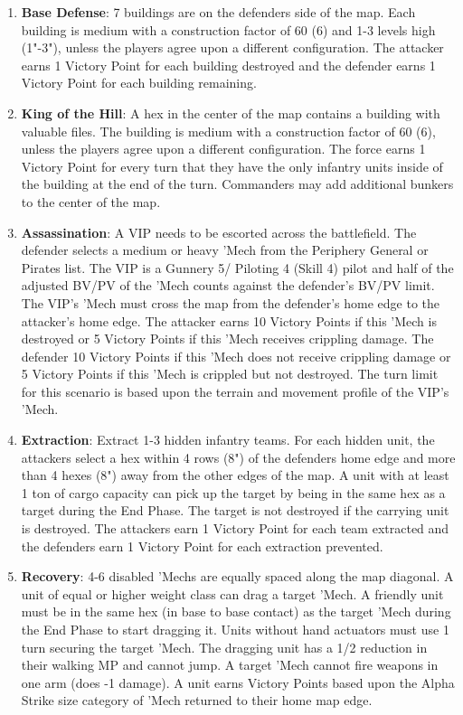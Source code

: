 \begin{enumerate}
  \item {\bfseries Base Defense}: 7 buildings are on the defenders side of the map.
    Each building is medium with a construction factor of 60 (6) and 1-3 levels high (1"-3"), unless the players agree upon a different configuration.
    The attacker earns 1 Victory Point for each building destroyed and the defender earns 1 Victory Point for each building remaining.

  \item {\bfseries King of the Hill}: A hex in the center of the map contains a building with valuable files.
    The building is medium with a construction factor of 60 (6), unless the players agree upon a different configuration.
    The force earns 1 Victory Point for every turn that they have the only infantry units inside of the building at the end of the turn.
    Commanders may add additional bunkers to the center of the map.

\item {\bfseries Assassination}: A VIP needs to be escorted across the battlefield.
    The defender selects a medium or heavy 'Mech from the Periphery General or Pirates list.
    The VIP is a Gunnery 5/ Piloting 4 (Skill 4) pilot and half of the adjusted BV/PV of the 'Mech counts against the defender's BV/PV limit.
    The VIP's 'Mech must cross the map from the defender's home edge to the attacker's home edge.
    The attacker earns 10 Victory Points if this 'Mech is destroyed or 5 Victory Points if this 'Mech receives crippling damage.
    The defender 10 Victory Points if this 'Mech does not receive crippling damage or 5 Victory Points if this 'Mech is crippled but not destroyed.
    The turn limit for this scenario is based upon the terrain and movement profile of the VIP's 'Mech.

  \item {\bfseries Extraction}: Extract 1-3 hidden infantry teams.
    For each hidden unit, the attackers select a hex within 4 rows (8") of the defenders home edge and more than 4 hexes (8") away from the other edges of the map.
    A unit with at least 1 ton of cargo capacity can pick up the target by being in the same hex as a target during the End Phase.
    The target is not destroyed if the carrying unit is destroyed.
    The attackers earn 1 Victory Point for each team extracted and the defenders earn 1 Victory Point for each extraction prevented.

  \item {\bfseries Recovery}: 4-6 disabled 'Mechs are equally spaced along the map diagonal.
    A unit of equal or higher weight class can drag a target 'Mech.
    A friendly unit must be in the same hex (in base to base contact) as the target 'Mech during the End Phase to start dragging it.
    Units without hand actuators must use 1 turn securing the target 'Mech.
    The dragging unit has a 1/2 reduction in their walking MP and cannot jump.
    A target 'Mech cannot fire weapons in one arm (does -1 damage).
    A unit earns Victory Points based upon the Alpha Strike size category of 'Mech returned to their home map edge.

\end{enumerate}
